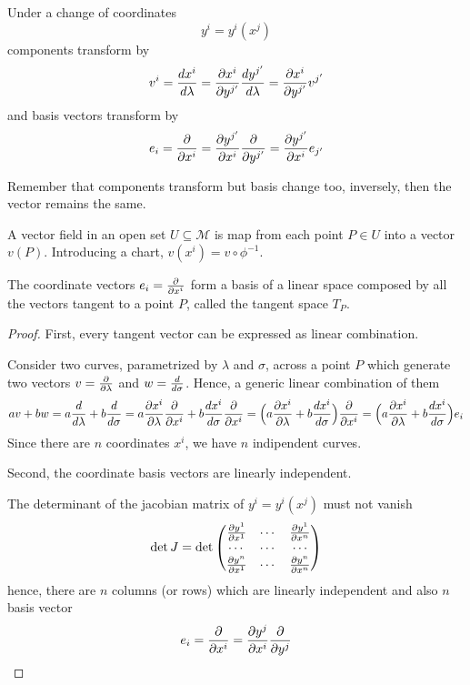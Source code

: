     Under a change of coordinates
    \begin{equation*}
        y^i = y^i(x^j)
    \end{equation*}
    components transform by 
    \begin{equation*}
        v^i = \frac{dx^i}{d\lambda} = \frac{\partial x^i}{\partial y^{j'}} \frac{dy^{j'}}{d\lambda} = \frac{\partial x^i}{\partial y^{j'}} v^{j'}
    \end{equation*}
    and basis vectors transform by 
    \begin{equation*}
        e_i = \frac{\partial}{\partial x^i} = \frac{\partial y^{j'}}{\partial x^i} \frac{\partial}{\partial y^{j'}} = \frac{\partial y^{j'}}{\partial x^i} e_{j'}
    \end{equation*}

    Remember that components transform but basis change too, inversely, then the vector remains the same.

    A vector field in an open set $U \subseteq \mathcal M$ is map from each point $P \in U$ into a vector $v(P)$. Introducing a chart, $v (x^i) = v \circ \phi^{-1}$.

    The coordinate vectors $e_i = \frac{\partial}{\partial x^i}$ form a basis of a linear space composed by all the vectors tangent to a point $P$, called the tangent space $T_P$.

    \begin{proof}
    First, every tangent vector can be expressed as linear combination.
    
    Consider two curves, parametrized by $\lambda$ and $\sigma$, across a point $P$ which generate two vectors $v = \frac{\partial}{\partial\lambda}$ and $w = \frac{d}{d\sigma}$. Hence, a generic linear combination of them
    \begin{equation*}
        a v + b w = a \frac{d}{d\lambda} + b \frac{d}{d\sigma} = a \frac{\partial x^i}{\partial\lambda} \frac{\partial}{\partial x^i} + b \frac{dx^i}{d\sigma} \frac{\partial}{\partial x^i} = \Big ( a \frac{\partial x^i}{\partial\lambda} + b \frac{dx^i}{d\sigma} \Big ) \frac{\partial}{\partial x^i} = \Big ( a \frac{\partial x^i}{\partial\lambda} + b \frac{dx^i}{d\sigma} \Big ) e_i
    \end{equation*}
    Since there are $n$ coordinates $x^i$, we have $n$ indipendent curves.

    Second, the coordinate basis vectors are linearly independent. 
    
    The determinant of the jacobian matrix of $y^i = y^i(x^j)$ must not vanish
    \begin{equation*}
        \det J = \det 
        \begin{pmatrix}
            \frac{\partial y^1}{\partial x^1} & \cdots & \frac{\partial y^1}{\partial x^n} \\
            \cdots & \cdots & \cdots \\
            \frac{\partial y^n}{\partial x^1} & \cdots & \frac{\partial y^n}{\partial x^n} \\
        \end{pmatrix}
    \end{equation*}
    hence, there are $n$ columns (or rows) which are linearly independent and also $n$ basis vector
    \begin{equation*}
        e_i = \frac{\partial}{\partial x^i} = \frac{\partial y^j}{\partial x^i} \frac{\partial}{\partial y^j}
    \end{equation*}

    \end{proof}

